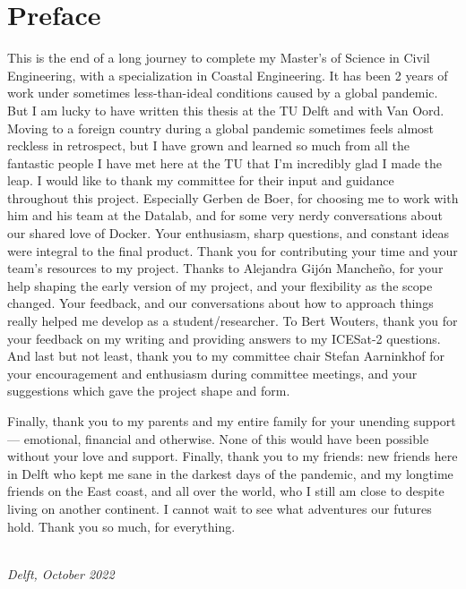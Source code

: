 \chapter*{Preface}


This is the end of a long journey to complete my Master's of Science in Civil Engineering, with a specialization in Coastal Engineering. It has been 2 years of work under sometimes less-than-ideal conditions caused by a global pandemic. But I am lucky to have written this thesis at the TU Delft and with Van Oord. Moving to a foreign country during a global pandemic sometimes feels almost reckless in retrospect, but I have grown and learned so much from all the fantastic people I have met here at the TU that I'm incredibly glad I made the leap.
\vskip 0.1in
I would like to thank my committee for their input and guidance throughout this project. Especially Gerben de Boer, for choosing me to work with him and his team at the Datalab, and for some very nerdy conversations about our shared love of Docker. Your enthusiasm, sharp questions, and constant ideas were integral to the final product. Thank you for contributing your time and your team's resources to my project. Thanks to Alejandra Gijón Mancheño, for your help shaping the early version of my project, and your flexibility as the scope changed. Your feedback, and our conversations about how to approach things really helped me develop as a student/researcher. To Bert Wouters, thank you for your feedback on my writing and providing answers to my ICESat-2 questions. And last but not least, thank you to my committee chair Stefan Aarninkhof for your encouragement and enthusiasm during committee meetings, and your suggestions which gave the project shape and form.
\vskip 0.1in

Finally, thank you to my parents and my entire family for your unending support --- emotional, financial and otherwise. None of this would have been possible without your love and support. Finally, thank you to my friends: new friends here in Delft who kept me sane in the darkest days of the pandemic, and my longtime friends on the East coast, and all over the world, who I still am close to despite living on another continent. I cannot wait to see what adventures our futures hold. Thank you so much, for everything.
\vskip 0.3in
\begin{flushright}
{\makeatletter\itshape
    \@author \\
    Delft, October 2022
\makeatother}
\end{flushright}

